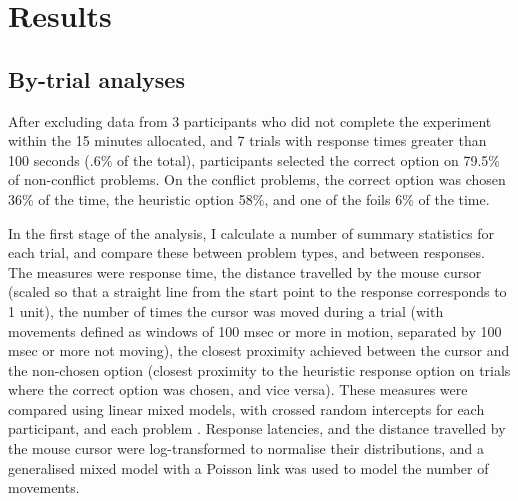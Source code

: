 
\section{Results}

\subsection{By-trial analyses}

After excluding data from 3 participants 
who did not complete the experiment within the 15 minutes allocated, 
and 7 trials with response times greater than 100 seconds (.6\% of the total), 
participants selected the correct option on 79.5\% of non-conflict problems.
On the conflict problems, the correct option was chosen 36\% of the time,
the heuristic option 58\%, and one of the foils 6\% of the time.

In the first stage of the analysis, 
I calculate a number of summary statistics for each trial, 
and compare these between problem types, and between responses. 
The measures were response time, 
the distance travelled by the mouse cursor
(scaled so that a straight line from the start point
 to the response corresponds to 1 unit),
the number of times the cursor was moved during a trial
(with movements defined as windows of 100 msec or more in motion, 
separated by 100 msec or more not moving), 
the closest proximity achieved between 
the cursor and the non-chosen option
(closest proximity to the heuristic response option 
on trials where the correct option was chosen, and vice versa). 
These measures were compared using linear mixed models, 
with crossed random intercepts for each participant, 
and each problem \citep{Baayen2008}.
Response latencies, and the distance travelled by the mouse cursor
were log-transformed to normalise their distributions, 
and a generalised mixed model with a Poisson link was used
to model the number of movements. 


